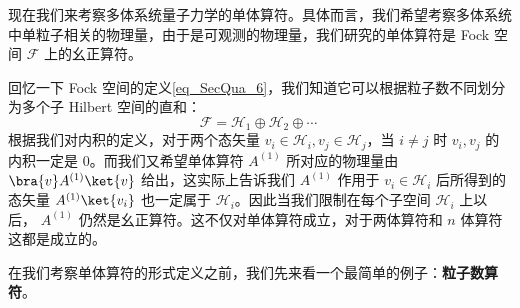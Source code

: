 

现在我们来考察多体系统量子力学的单体算符。具体而言，我们希望考察多体系统中单粒子相关的物理量，由于是可观测的物理量，我们研究的单体算符是 Fock 空间 $\mathcal{F}$ 上的幺正算符。

回忆一下 Fock 空间的定义\autoref{eq_SecQua_6}，我们知道它可以根据粒子数不同划分为多个子 Hilbert 空间的直和：
\begin{equation}\label{eq_oneopr_1}
\mathcal{F}=\mathcal{H}_1\oplus \mathcal{H}_2\oplus \cdots~
\end{equation}
根据我们对内积的定义，对于两个态矢量 $v_i\in \mathcal{H}_i, v_j\in \mathcal{H}_j$，当 $i\neq j$ 时 $v_i,v_j$ 的内积一定是 $0$。而我们又希望单体算符 $A^{(1)}$ 所对应的物理量由 $\bra{v}A^{(1)} \ket{v}$ 给出，这实际上告诉我们 $A^{(1)}$ 作用于 $v_i\in \mathcal{H}_i$ 后所得到的态矢量 $A^{(1)} \ket{v_i}$ 也一定属于 $\mathcal{H}_i$。因此当我们限制在每个子空间 $\mathcal{H}_i$ 上以后， $A^{(1)}$ 仍然是幺正算符。这不仅对单体算符成立，对于两体算符和 $n$ 体算符这都是成立的。

在我们考察单体算符的形式定义之前，我们先来看一个最简单的例子：\textbf{粒子数算符}。
